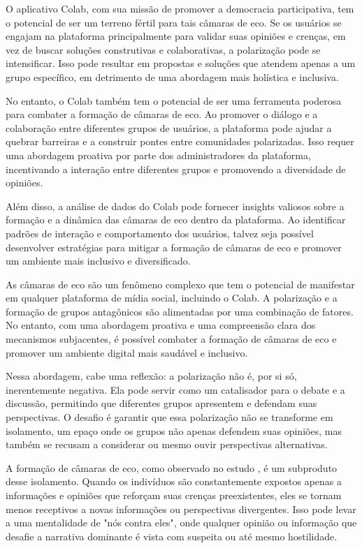 O aplicativo Colab, com sua missão de promover a democracia participativa, tem o potencial de ser um terreno fértil para tais câmaras de eco. Se os usuários se engajam na plataforma principalmente para validar suas opiniões e crenças, em vez de buscar soluções construtivas e colaborativas, a polarização pode se intensificar. Isso pode resultar em propostas e soluções que atendem apenas a um grupo específico, em detrimento de uma abordagem mais holística e inclusiva.

No entanto, o Colab também tem o potencial de ser uma ferramenta poderosa para combater a formação de câmaras de eco. Ao promover o diálogo e a colaboração entre diferentes grupos de usuários, a plataforma pode ajudar a quebrar barreiras e a construir pontes entre comunidades polarizadas. Isso requer uma abordagem proativa por parte dos administradores da plataforma, incentivando a interação entre diferentes grupos e promovendo a diversidade de opiniões.

Além disso, a análise de dados do Colab pode fornecer insights valiosos sobre a formação e a dinâmica das câmaras de eco dentro da plataforma. Ao identificar padrões de interação e comportamento dos usuários, talvez seja possível desenvolver estratégias para mitigar a formação de câmaras de eco e promover um ambiente mais inclusivo e diversificado.

As câmaras de eco são um fenômeno complexo que tem o potencial de manifestar em qualquer plataforma de mídia social, incluindo o Colab. A polarização e a formação de grupos antagônicos são alimentadas por uma combinação de fatores. No entanto, com uma abordagem proativa e uma compreensão clara dos mecanismos subjacentes, é possível combater a formação de câmaras de eco e promover um ambiente digital mais saudável e inclusivo.

Nessa abordagem, cabe uma reflexão: a polarização não é, por si só, inerentemente negativa. Ela pode servir como um catalisador para o debate e a discussão, permitindo que diferentes grupos apresentem e defendam suas perspectivas. O desafio é garantir que essa polarização não se transforme em isolamento, um epaço onde os grupos não apenas defendem suas opiniões, mas também se recusam a considerar ou mesmo ouvir perspectivas alternativas.

A formação de câmaras de eco, como observado no estudo , é um subproduto desse isolamento. Quando os indivíduos são constantemente expostos apenas a informações e opiniões que reforçam suas crenças preexistentes, eles se tornam menos receptivos a novas informações ou perspectivas divergentes. Isso pode levar a uma mentalidade de "nós contra eles", onde qualquer opinião ou informação que desafie a narrativa dominante é vista com suspeita ou até mesmo hostilidade.


